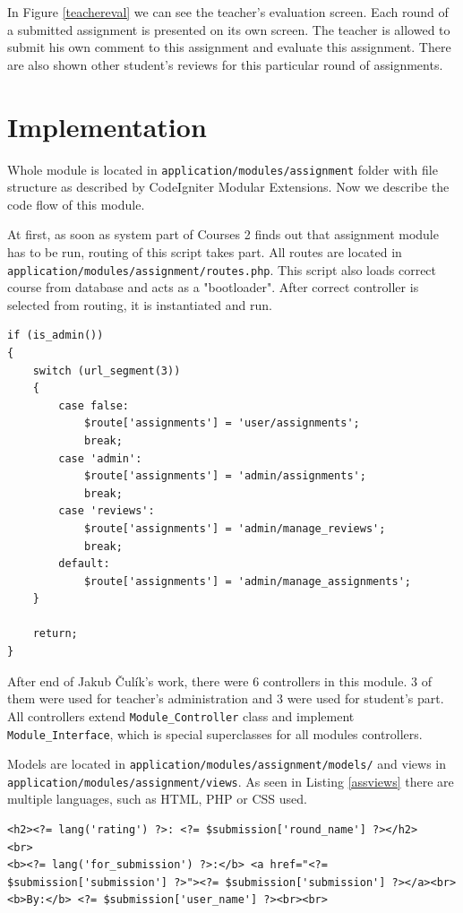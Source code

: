 In Figure \ref{teachereval} we can see the teacher's evaluation screen. Each round of a submitted assignment is presented on its own screen. The teacher is allowed to submit his own comment to this assignment and evaluate this assignment. There are also shown other student's reviews for this particular round of assignments. 

\section{Implementation}

Whole module is located in \texttt{application/modules/assignment} folder with file structure as described by CodeIgniter Modular Extensions. Now we describe the code flow of this module.


At first, as soon as system part of Courses 2 finds out that assignment module has to be run, routing of this script takes part. All routes are located in \texttt{application/modules/assignment/routes.php}. This script also loads correct course from database and acts as a "bootloader". After correct controller is selected from routing, it is instantiated and run.

\begin{lstlisting}[label={assrouting}, caption={Routing in assignments module for administrator}]
if (is_admin())
{
    switch (url_segment(3))
    {
        case false:
            $route['assignments'] = 'user/assignments';
            break;
        case 'admin':
            $route['assignments'] = 'admin/assignments';
            break;
        case 'reviews':
            $route['assignments'] = 'admin/manage_reviews';
            break;
        default:
            $route['assignments'] = 'admin/manage_assignments';
    }

    return;
}
\end{lstlisting}


After end of Jakub \v{C}ul\'{i}k's \cite{culik} work, there were 6 controllers in this module. 3 of them were used for teacher's administration and 3 were used for student's part. All controllers extend \texttt{Module\_Controller} class and implement \texttt{Module\_Interface}, which is special superclasses for all modules controllers.

Models are located in \texttt{application/modules/assignment/models/} and views in \texttt{application/modules/assignment/views}. As seen in Listing \ref{assviews} there are multiple languages, such as HTML, PHP or CSS used.

\begin{lstlisting}[label={assviews}, caption={Example of view in assignments module}]
<h2><?= lang('rating') ?>: <?= $submission['round_name'] ?></h2>
<br>
<b><?= lang('for_submission') ?>:</b> <a href="<?= $submission['submission'] ?>"><?= $submission['submission'] ?></a><br>
<b>By:</b> <?= $submission['user_name'] ?><br><br>
\end{lstlisting}
